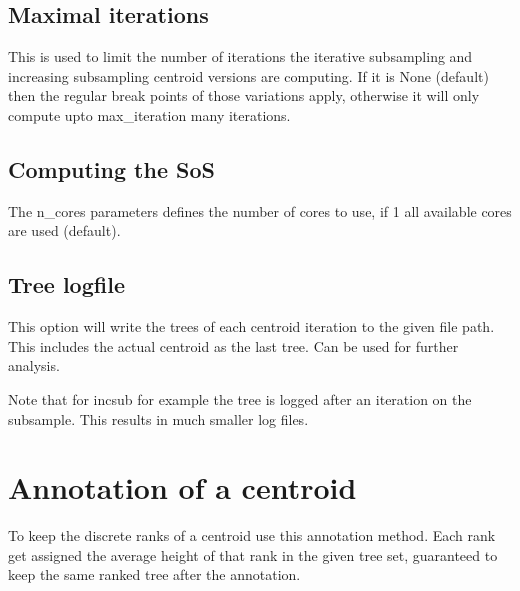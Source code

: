 \documentclass[letterpaper,10pt,english]{sphinxmanual}
\begin{document}
\subsection{Maximal iterations}
\label{\detokenize{summary:maximal-iterations}}
\sphinxAtStartPar
This is used to limit the number of iterations the iterative subsampling and increasing subsampling centroid versions are computing.
If it is None (default) then the regular break points of those variations apply, otherwise it will only compute upto max\_iteration
many iterations.


\subsection{Computing the SoS}
\label{\detokenize{summary:computing-the-sos}}
\sphinxAtStartPar
The n\_cores parameters defines the number of cores to use, if \sphinxhyphen{}1 all available cores are used (default).


\subsection{Tree logfile}
\label{\detokenize{summary:tree-logfile}}
\sphinxAtStartPar
This option will write the trees of each centroid iteration to the given file path.
This includes the actual centroid as the last tree.
Can be used for further analysis.

\sphinxAtStartPar
Note that for incsub for example the tree is logged after an iteration on the subsample.
This results in much smaller log files.


\section{Annotation of a centroid}
\label{\detokenize{summary:annotation-of-a-centroid}}
\sphinxAtStartPar
To keep the discrete ranks of a centroid use this annotation method.
Each rank get assigned the average height of that rank in the given tree set, guaranteed to keep the same ranked tree after the annotation.

\begin{sphinxVerbatim}[commandchars=\\\{\}]
   
     
     
\end{sphinxVerbatim}
\end{document}
